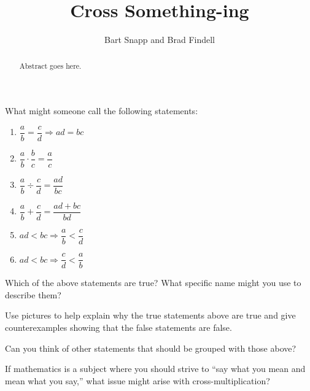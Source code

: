 \documentclass{ximera}
\title{Cross Something-ing}
\author{Bart Snapp and Brad Findell}
\begin{document}
\begin{abstract}
Abstract goes here.  
\end{abstract}
\maketitle

\label{A:CrossSomething}


\begin{problem} 
What might someone call the following statements:
\begin{enumerate}
\item $\dfrac{a}{b} = \dfrac{c}{d} \Rightarrow ad = bc$
\item $\dfrac{a}{b}\cdot \dfrac{b}{c} = \dfrac{a}{c}$
\item $\dfrac{a}{b}\div \dfrac{c}{d} = \dfrac{ad}{bc}$
\item $\dfrac{a}{b} +\dfrac{c}{d} = \dfrac{ad+bc}{bd}$
\item $ad < bc \Rightarrow \dfrac{a}{b} < \dfrac{c}{d}$
\item $ad < bc \Rightarrow \dfrac{c}{d} < \dfrac{a}{b}$
\end{enumerate}
\end{problem}

\begin{problem}
Which of the above statements are true? What specific name might you
use to describe them?
\end{problem}

\begin{problem} 
Use pictures to help explain why the true statements above are true
and give counterexamples showing that the false statements are false.
\end{problem}


\begin{problem} 
Can you think of other statements that should be grouped with those
above?
\end{problem}

\begin{problem}
If mathematics is a subject where you should strive to ``say what you
mean and mean what you say,'' what issue might arise with
cross-multiplication?
\end{problem}
\end{document}
